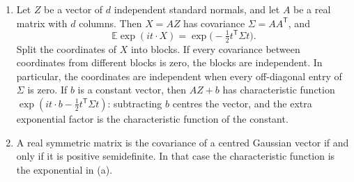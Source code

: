 \begin{theorem}\label{thm:gaussvec}
\begin{enumerate}[label=(\alph*)]
\item Let $Z$ be a vector of $d$ independent standard normals, and let $A$ be a real matrix with $d$ columns. Then $X=AZ$ has covariance $\Sigma=AA^{\mathsf T}$, and
\[
 \mathbb E\exp(it\cdot X)=\exp\bigl(-\tfrac12 t^{\mathsf T}\Sigma t\bigr).
\]
Split the coordinates of $X$ into blocks. If every covariance between coordinates from different blocks is zero, the blocks are independent. In particular, the coordinates are independent when every off-diagonal entry of $\Sigma$ is zero. If $b$ is a constant vector, then $AZ+b$ has characteristic function $\exp(it\cdot b-\tfrac12 t^{\mathsf T}\Sigma t)$: subtracting $b$ centres the vector, and the extra exponential factor is the characteristic function of the constant.
\item A real symmetric matrix is the covariance of a centred Gaussian vector if and only if it is positive semidefinite. In that case the characteristic function is the exponential in (a).
\end{enumerate}
\end{theorem}
